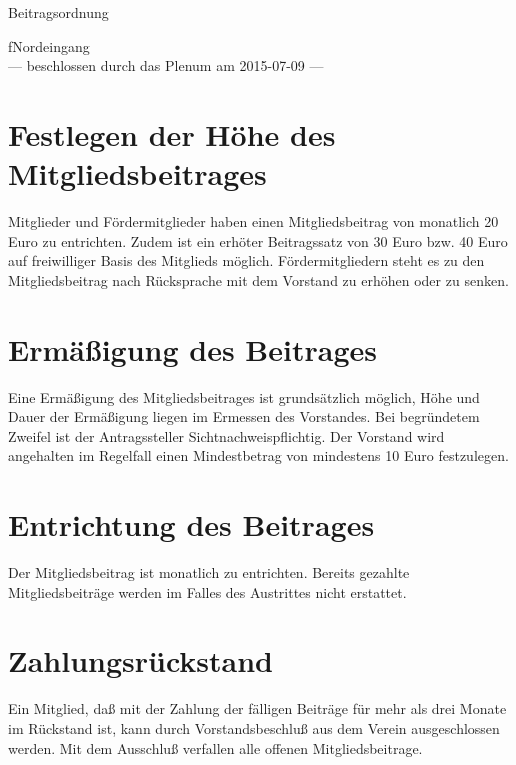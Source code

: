 \documentclass[ngerman]{scrartcl}
\begin{document}
\renewcommand*{\othersectionlevelsformat}[3]{\S#3\autodot\enskip}
\begin{titlepage}
\centerline{\Large Beitragsordnung}
\begin{center}
{\Huge fNordeingang}\\[5mm]
\vfill
--- beschlossen durch das Plenum am 2015-07-09 ---
\end{center}
\end{titlepage}
\section{Festlegen der Höhe des Mitgliedsbeitrages}
Mitglieder und Fördermitglieder haben einen Mitgliedsbeitrag von monatlich
20 Euro zu entrichten. Zudem ist ein erhöter Beitragssatz von 30 Euro bzw. 40 Euro auf freiwilliger Basis des Mitglieds möglich.
Fördermitgliedern steht es zu den Mitgliedsbeitrag nach Rücksprache mit dem Vorstand zu erhöhen oder zu senken.
\section{Ermäßigung des Beitrages}
Eine Ermäßigung des Mitgliedsbeitrages ist grundsätzlich möglich, Höhe und
Dauer der Ermäßigung liegen im Ermessen des Vorstandes. Bei begründetem
Zweifel ist der Antragssteller Sichtnachweispflichtig. Der Vorstand wird angehalten im Regelfall einen Mindestbetrag von mindestens 10 Euro festzulegen.
\section{Entrichtung des Beitrages}
Der Mitgliedsbeitrag ist monatlich zu entrichten.
Bereits gezahlte Mitgliedsbeiträge werden im Falles
des Austrittes nicht erstattet.
\section{Zahlungsrückstand}
Ein Mitglied, daß mit der Zahlung der fälligen Beiträge für mehr als drei
Monate im Rückstand ist, kann durch Vorstandsbeschluß aus dem Verein
ausgeschlossen werden. Mit dem Ausschluß verfallen alle offenen Mitgliedsbeitrage.
\end{document}
